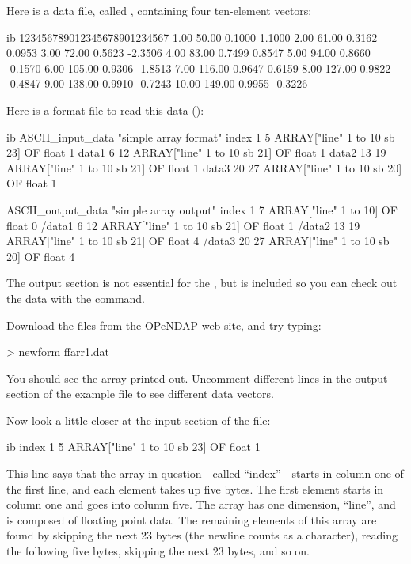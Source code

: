 Here is a data file, called
, containing
four ten-element vectors:

\begin{vcode}{ib}
123456789012345678901234567
 1.00  50.00 0.1000  1.1000
 2.00  61.00 0.3162  0.0953
 3.00  72.00 0.5623 -2.3506
 4.00  83.00 0.7499  0.8547
 5.00  94.00 0.8660 -0.1570
 6.00 105.00 0.9306 -1.8513
 7.00 116.00 0.9647  0.6159
 8.00 127.00 0.9822 -0.4847
 9.00 138.00 0.9910 -0.7243
10.00 149.00 0.9955 -0.3226
\end{vcode}

Here is a format file to read this data
():

\begin{vcode}{ib}
ASCII_input_data "simple array format"
index 1 5 ARRAY["line" 1 to 10 sb 23] OF float 1
data1 6 12 ARRAY["line" 1 to 10 sb 21] OF float 1
data2 13 19 ARRAY["line" 1 to 10 sb 21] OF float 1
data3 20 27 ARRAY["line" 1 to 10 sb 20] OF float 1

ASCII_output_data "simple array output"
index 1 7 ARRAY["line" 1 to 10] OF float 0
/data1 6 12 ARRAY["line" 1 to 10 sb 21] OF float 1
/data2 13 19 ARRAY["line" 1 to 10 sb 21] OF float 4
/data3 20 27 ARRAY["line" 1 to 10 sb 20] OF float 4
\end{vcode}

The output section is not essential for the \ffs , but is included so
you can check out the data with the  command.

Download the files from the OPeNDAP web site, and try typing:

\begin{example}
> newform ffarr1.dat
\end{example}

You should see the  array printed out.  Uncomment different
lines in the output section of the example file to see different data
vectors. 

Now look a little closer at the input section of the file:

\begin{vcode}{ib}
index 1 5 ARRAY["line" 1 to 10 sb 23] OF float 1
\end{vcode}

This line says that the array in question---called ``index''---starts
in column one of the first line, and each element takes up five bytes.
The first element starts in column one and goes into column five.  The
array has one dimension, ``line'', and is composed of floating point
data.  The remaining elements of this array are found by skipping the
next 23 bytes (the newline counts as a character), reading the
following five bytes, skipping the next 23 bytes, and so on.

